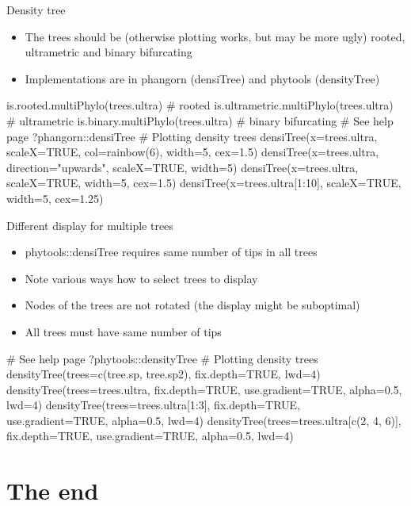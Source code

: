 \documentclass[compress,  xelatex, 11pt, xcolor=x11names, aspectratio=169,
	hyperref={
		bookmarks=true,
		unicode=true,
		colorlinks=true,
		pdftitle={HybSeq course},
		plainpages=false,
		pdfauthor={Vojtech Zeisek},
		pdfsubject={Practical processing of HybSeq target enrichment sequencing data on computing grids like MetaCentrum},
		pdfcreator={XeLaTeX},
		pdfkeywords={BASH, command line, GNU, HybSeq, Linux, MetaCentrum, sequencing shell, target enrichment},
		linkcolor=Turquoise4, %
		anchorcolor=DodgerBlue4, %
		citecolor=DodgerBlue4, %
		filecolor=DodgerBlue4, %
		menucolor=Tan4, %
		urlcolor=DarkOliveGreen4 %
		},
	url={hyphens, lowtilde} %
	]{beamer}
\renewcommand{\texttt}[1]{\colorbox{Cornsilk2}{{\ttfamily #1}}}
\begin{document}
\begin{frame}[fragile]{Density tree}
	\begin{itemize}
		\item The trees should be (otherwise plotting works, but may be more ugly) rooted, ultrametric and binary bifurcating
		\item Implementations are in \texttt{phangorn} (\texttt{densiTree}) and \texttt{phytools} (\texttt{densityTree})
	\end{itemize}
	\begin{spluscode}
    is.rooted.multiPhylo(trees.ultra) # rooted
    is.ultrametric.multiPhylo(trees.ultra) # ultrametric
    is.binary.multiPhylo(trees.ultra) # binary bifurcating
    # See help page
    ?phangorn::densiTree
    # Plotting density trees
    densiTree(x=trees.ultra, scaleX=TRUE, col=rainbow(6), width=5, cex=1.5)
    densiTree(x=trees.ultra, direction="upwards", scaleX=TRUE, width=5)
    densiTree(x=trees.ultra, scaleX=TRUE, width=5, cex=1.5)
    densiTree(x=trees.ultra[1:10], scaleX=TRUE, width=5, cex=1.25)
	\end{spluscode}
\end{frame}

\begin{frame}[fragile]{Different display for multiple trees}
	\begin{itemize}
		\item \texttt{phytools::densiTree} requires same number of tips in all trees
		\item Note various ways how to select trees to display
		\item Nodes of the trees are not rotated (the display might be suboptimal)
		\item All trees must have same number of tips
	\end{itemize}
	\begin{spluscode}
    # See help page
    ?phytools::densityTree
    # Plotting density trees
    densityTree(trees=c(tree.sp, tree.sp2), fix.depth=TRUE, lwd=4)
    densityTree(trees=trees.ultra, fix.depth=TRUE, use.gradient=TRUE,
      alpha=0.5, lwd=4)
    densityTree(trees=trees.ultra[1:3], fix.depth=TRUE, use.gradient=TRUE,
      alpha=0.5, lwd=4)
    densityTree(trees=trees.ultra[c(2, 4, 6)], fix.depth=TRUE,
      use.gradient=TRUE, alpha=0.5, lwd=4)
	\end{spluscode}
\end{frame}

\section{The end}
\end{document}
